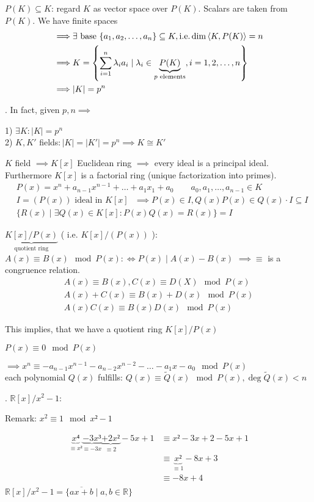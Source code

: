 $P(K) \subseteq K$: regard $K$ as vector space over $P(K)$. Scalars are taken from $P(K)$. We have finite spaces
\begin{align*}
  \implies & \exists \text{ base } \{ a_1, a_2, \ldots, a_n \} \subseteq K, \text{i.e.} \dim \left\langle K , P(K) \right\rangle = n\\
  \implies & K= \left\{\sum_{i=1}^n \lambda_i a_i \mid \lambda_i \in \underbrace{P(K)}_{p\text{ elements}}, i = 1,2,\ldots,n\right\} \\
  \implies & |K| = p^n
\end{align*}

\Remark.
In fact, given $p,n \implies $

1) $\exists K: |K| = p^n$\\
2) $K, K'$ fields$: |K| = |K'| = p^n \implies K \cong K'$

$K$ field $\implies K[x]$ Euclidean ring $\implies$ every ideal is a principal ideal. Furthermore $K[x]$ is a factorial ring (unique factorization into primes).
\begin{align*}
  & P(x)= x^n + a_{n-1} x^{n-1} + \ldots + a_1 x_1 + a_0 \qquad a_0, a_1, \ldots ,a_{n-1} \in K \\
  & I = (P(x)) \text{ ideal in $K[x]$ } \implies P(x) \in I, Q(x)P(x) \in Q(x) \cdot I \subseteq I \\
  & \{R(x) \mid \exists Q(x) \in K[x] : P(x)Q(x) = R(x)\} = I
\end{align*}

$\underbrace{K[x]/ P(x)}_{\text{quotient ring}}$ ( i.e. $K[x] / (P(x))$ ): $A(x) \equiv B(x) \mod P(x) :\Leftrightarrow P(x) ∣ A(x) - B(x)$ $\implies \equiv $ is a congruence relation.
\begin{align*}
  A(x) \equiv B(x), C(x) \equiv D(X) \mod P(x) \\
  A(x) + C(x) \equiv B(x) + D(x) \mod P(x) \\
  A(x)C(x) \equiv B(x) D(x) \mod P(x)
\end{align*}

This implies, that we have a quotient ring $K[x]/ P(x)$

$P(x) \equiv 0 \mod P(x)$

$\implies x^n \equiv -a_{n-1}x^{n-1} - a_{n-2}x^{n-2} - \ldots - a_1 x - a_0 \mod P(x)$\\
each polynomial $Q(x)$ fulfills:
$Q(x) \equiv \tilde{Q}(x) \mod P(x), \deg \tilde{Q}(x)<n$

\Example.
$\mathbb{R}[x] / x^2-1$:
\begin{leftbar}
  Remark: $x^2 \equiv 1 \mod {x² -1}$
\end{leftbar}\vspace{-1cm}
\begin{align*}
  \underbrace{x⁴}_{\equiv x²}
  \underbrace{-3x³}_{\equiv -3x}
  \underbrace{+2x²}_{\equiv 2}
  -5x + 1                       & \equiv x² - 3x +2 - 5x + 1\\
                                & \equiv \underbrace{x²}_{\equiv 1} - 8x + 3\\
                                & \equiv -8x + 4\\
\end{align*}
$\mathbb{R}[x] / x^2 -1 = \{ \overline{ax+b} \mid a,b \in \mathbb{R} \}$

